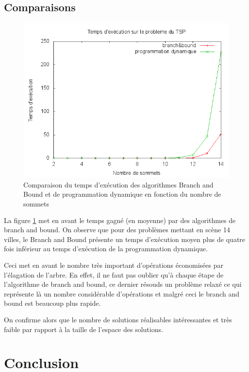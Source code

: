 \subsection{Comparaisons}

\begin{figure}[H]
	\begin{center}
	\includegraphics[width=\linewidth]{../pratique/comp.png}
\end{center}
\caption{Comparaison du temps d'exécution des algorithmes Branch and Bound et de programmation
dynamique en fonction du nombre de sommets}
\label{comp_algo}
\end{figure}

La figure \ref{comp_algo} met en avant le temps gagné (en moyenne) par des algorithmes de branch and
bound. On observe que pour des problèmes mettant en scène 14 villes, le Branch and Bound présente un
temps d'exécution moyen plus de quatre fois inférieur au temps d'exécution de la programmation
dynamique. 

Ceci met en avant le nombre très important d'opérations économisées par l'élagation de l'arbre. En
effet, il ne faut pas oublier qu'à chaque étape de l'algorithme de branch and bound, ce dernier
résouds un problème relaxé ce qui représente là un nombre considérable d'opérations et malgré ceci
le branch and bound est beaucoup plus rapide.

On confirme alors que le nombre de solutions réalisables intéressantes et très faible par rapport à
la taille de l'espace des solutions.

\section{Conclusion}

